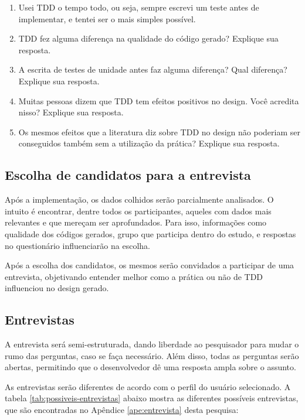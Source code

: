 \begin{enumerate}
	\item Usei TDD o tempo todo, ou seja, sempre escrevi um teste antes de implementar, e tentei ser o mais simples possível.
	\item TDD fez alguma diferença na qualidade do código gerado? Explique sua resposta.
	\item A escrita de testes de unidade antes faz alguma diferença? Qual diferença? Explique sua resposta.
	\item Muitas pessoas dizem que TDD tem efeitos positivos no design. Você acredita nisso? Explique sua resposta.
	\item Os mesmos efeitos que a literatura diz sobre TDD no design não poderiam ser conseguidos também sem a utilização da prática? Explique sua resposta.
\end{enumerate}

\subsection{Escolha de candidatos para a entrevista}

Após a implementação, os dados colhidos serão parcialmente analisados. O intuito
é encontrar, dentre todos os participantes, aqueles com dados mais relevantes
e que mereçam ser aprofundados.
Para isso, informações como qualidade dos códigos gerados, grupo que participa
dentro do estudo, e respostas no questionário influenciarão na escolha.

Após a escolha dos candidatos, os mesmos serão convidados a participar de
uma entrevista, objetivando entender melhor como a prática ou não de TDD
influenciou no design gerado.

\subsection{Entrevistas}
\label{sec:planejamento-estrategia-entrevistas}

A entrevista será semi-estruturada, dando liberdade ao
pesquisador para mudar o rumo das perguntas, caso se faça necessário.
Além disso, todas as perguntas serão abertas, permitindo que o desenvolvedor dê
uma resposta ampla sobre o assunto.

As entrevistas serão diferentes de acordo com o perfil do usuário selecionado.
A tabela \ref{tab:possiveis-entrevistas} abaixo mostra as diferentes possíveis entrevistas, que são encontradas
no Apêndice \ref{ape:entrevista} desta pesquisa:

